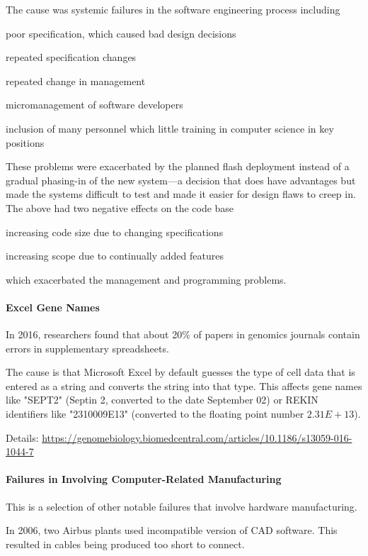 The cause was systemic failures in the software engineering process including
\begin{compactitem}
 \item poor specification, which caused bad design decisions
 \item repeated specification changes
 \item repeated change in management
 \item micromanagement of software developers
 \item inclusion of many personnel which little training in computer science in key positions
\end{compactitem}
These problems were exacerbated by the planned flash deployment instead of a gradual phasing-in of the new system---a decision that does have advantages but made the systems difficult to test and made it easier for design flaws to creep in.
The above had two negative effects on the code base
\begin{compactitem}
 \item increasing code size due to changing specifications
 \item increasing scope due to continually added features
\end{compactitem}
which exacerbated the management and programming problems.

\paragraph{Excel Gene Names}
In 2016, researchers found that about 20\% of papers in genomics journals contain errors in supplementary spreadsheets.

The cause is that Microsoft Excel by default guesses the type of cell data that is entered as a string and converts the string into that type.
This affects gene names like "SEPT2" (Septin 2, converted to the date September 02) or REKIN identifiers like "2310009E13" (converted to the floating point number $2.31E+13$).

Details: \url{https://genomebiology.biomedcentral.com/articles/10.1186/s13059-016-1044-7}

\paragraph{Failures in Involving Computer-Related Manufacturing}
This is a selection of other notable failures that involve hardware manufacturing.

In 2006, two Airbus plants used incompatible version of CAD software.
This resulted in cables being produced too short to connect.

